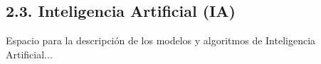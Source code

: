 \subsection{2.3. Inteligencia Artificial (IA)}\label{sec:ia}

Espacio para la descripción de los modelos y algoritmos de Inteligencia Artificial...
